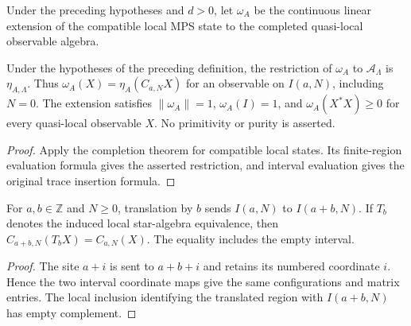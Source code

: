 \begin{definition}
    \label{def:mps_quasi_local_expectation}
    \leanok
    Under the preceding hypotheses and $d>0$, let $\omega_A$ be the
    continuous linear extension of the compatible local MPS state to the
    completed quasi-local observable algebra.
\end{definition}

\begin{lemma}
    \label{thm:mps_quasi_local_expectation_state}
    \leanok
    Under the hypotheses of the preceding definition, the restriction of
    $\omega_A$ to $\mathcal A_\Lambda$ is $\eta_{A,\Lambda}$.
    Thus $\omega_A(X)=\eta_A(C_{a,N}X)$ for an observable on $I(a,N)$,
    including $N=0$. The extension satisfies
    $\|\omega_A\|=1$, $\omega_A(I)=1$, and $\omega_A(X^*X)\geq0$
    for every quasi-local observable $X$. No primitivity or purity is asserted.
\end{lemma}
\begin{proof}\leanok
    Apply the completion theorem for compatible local states. Its finite-region
    evaluation formula gives the asserted restriction, and interval evaluation
    gives the original trace insertion formula.
\end{proof}

\begin{lemma}
    \label{thm:local_interval_translation_coordinates}
    \leanok
    For $a,b\in\mathbb Z$ and $N\geq0$, translation by $b$ sends
    $I(a,N)$ to $I(a+b,N)$. If $T_b$ denotes the induced local
    star-algebra equivalence, then
    $C_{a+b,N}(T_bX)=C_{a,N}(X)$.
    The equality includes the empty interval.
\end{lemma}
\begin{proof}\leanok
    The site $a+i$ is sent to $a+b+i$ and retains its numbered coordinate
    $i$. Hence the two interval coordinate maps give the same configurations
    and matrix entries. The local inclusion identifying the translated region
    with $I(a+b,N)$ has empty complement.
\end{proof}

